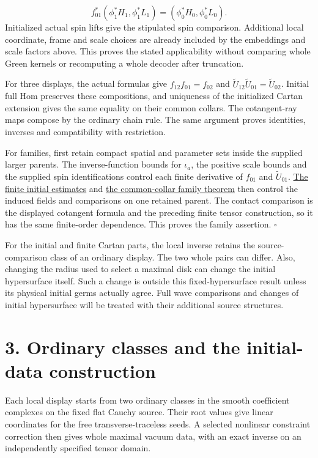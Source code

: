 \documentclass[
  english,
  11pt,
  reqno]{amsart}
\begin{document}
\label{eq:online-fixed-slice-exterior-gauge-identity} \[
f_{01}^*(\phi_1^*H_1,\phi_1^*L_1)
=(\phi_0^*H_0,\phi_0^*L_0).
\] Initialized actual spin lifts give the stipulated spin comparison.
Additional local coordinate, frame and scale choices are already
included by the embeddings and scale factors above. This proves the
stated applicability without comparing whole Green kernels or
recomputing a whole decoder after truncation.

For three displays, the actual formulas give \(f_{12}f_{01}=f_{02}\) and
\(\widetilde U_{12}\widetilde U_{01}=\widetilde U_{02}\). Initial full
Hom preserves these compositions, and uniqueness of the initialized
Cartan extension gives the same equality on their common collars. The
cotangent-ray maps compose by the ordinary chain rule. The same argument
proves identities, inverses and compatibility with restriction.

For families, first retain compact spatial and parameter sets inside the
supplied larger parents. The inverse-function bounds for \(\iota_a\),
the positive scale bounds and the supplied spin identifications control
each finite derivative of \(f_{01}\) and \(\widetilde U_{01}\).
\hyperref[prop:online-initial-gradient-descent-families]{The finite
initial estimates} and
\hyperref[thm:online-common-collar-finite-families]{the common-collar
family theorem} then control the induced fields and comparisons on one
retained parent. The contact comparison is the displayed cotangent
formula and the preceding finite tensor construction, so it has the same
finite-order dependence. This proves the family assertion.
\hfill\(\square\)

For the initial and finite Cartan parts, the local inverse retains the
source-comparison class of an ordinary display. The two whole pairs can
differ. Also, changing the radius used to select a maximal disk can
change the initial hypersurface itself. Such a change is outside this
fixed-hypersurface result unless its physical initial germs actually
agree. Full wave comparisons and changes of initial hypersurface will be
treated with their additional source structures.

\section{3. Ordinary classes and the initial-data
construction}\label{ordinary-classes-and-the-initial-data-construction}\label{sec:online-ordinary-input-construction}

Each local display starts from two ordinary classes in the smooth
coefficient complexes on the fixed flat Cauchy source. Their root values
give linear coordinates for the free transverse-traceless seeds. A
selected nonlinear constraint correction then gives whole maximal vacuum
data, with an exact inverse on an independently specified tensor domain.
\end{document}
